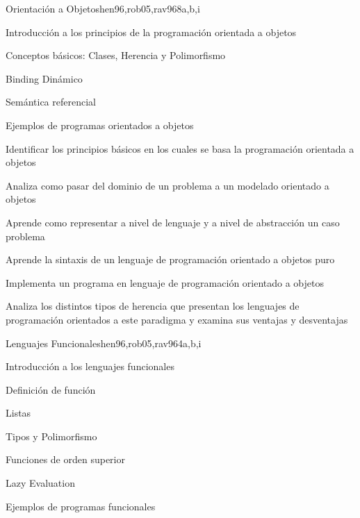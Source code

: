 \begin{syllabus}
\begin{unit}{Orientación a Objetos}{hen96,rob05,rav96}{8}{a,b,i}
\begin{topics}
      \item Introducción a los principios de la programación orientada a objetos
      \item Conceptos básicos: Clases, Herencia y Polimorfismo
      \item Binding Dinámico
      \item Semántica referencial
      \item Ejemplos de programas orientados a objetos
   \end{topics}

   \begin{learningoutcomes}
      \item Identificar los principios básicos en los cuales se basa la programación orientada a objetos
      \item Analiza como pasar del dominio de un problema a un modelado orientado a objetos
      \item Aprende como representar a nivel de lenguaje y a nivel de abstracción un caso problema
      \item Aprende la sintaxis de un lenguaje de programación orientado a objetos puro
      \item Implementa un programa en lenguaje de programación orientado a objetos
      \item Analiza los distintos tipos de herencia que presentan los lenguajes de programación orientados a este paradigma y examina sus ventajas y desventajas
   \end{learningoutcomes}
\end{unit}

\begin{unit}{Lenguajes Funcionales}{hen96,rob05,rav96}{4}{a,b,i}
\begin{topics}
    \item Introducción a los lenguajes funcionales
      \item Definición de función
      \item Listas
      \item Tipos y Polimorfismo
      \item Funciones de orden superior
      \item Lazy Evaluation
      \item Ejemplos de programas funcionales
   \end{topics}


\end{unit}
\end{syllabus}
